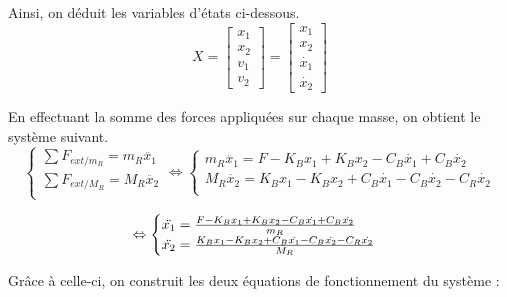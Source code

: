 \documentclass[a4paper,12pt]{article}
\begin{document}
    Ainsi, on déduit les variables d'états ci-dessous.
    \[
        X =
        \begin{bmatrix}
            x_1 \\
            x_2 \\
            v_1 \\
            v_2
        \end{bmatrix}
        =
        \begin{bmatrix}
            x_1 \\
            x_2 \\
            \dot{x_1} \\
            \dot{x_2}
        \end{bmatrix}
    \]
    
    En effectuant la somme des forces appliquées sur chaque masse, on obtient le système suivant.
    \[
        \begin{cases}
            \sum F_{ext/m_R} = m_R\ddot{x_1} \\
            \sum F_{ext/M_R} = M_R\ddot{x_2} \\
        \end{cases}
        \Leftrightarrow
        \begin{cases}
            m_R\ddot{x_1} = F - K_B x_1 + K_B x_2 - C_B \dot{x_1} + C_B\dot{x_2} \\
            M_R\ddot{x_2} = K_B x_1 - K_B x_2 + C_B \dot{x_1} - C_B\dot{x_2} - C_R \dot{x_2} \\
        \end{cases}
    \]
    
    \begin{equation}
        \\ \Leftrightarrow
        \begin{cases}
            \ddot{x_1} = \frac{F - K_B x_1 + K_B x_2 - C_B \dot{x_1} + C_B \dot{x_2}}{m_R} \\
            \ddot{x_2} = \frac{K_B x_1 - K_B x_2 + C_B \dot{x_1} - C_B \dot{x_2} - C_R \dot{x_2}}{M_R}
        \end{cases}
        \label{eq:SommeDesForces}
    \end{equation}
    
    Grâce à celle-ci, on construit les deux équations de fonctionnement du système :
    
\end{document}
